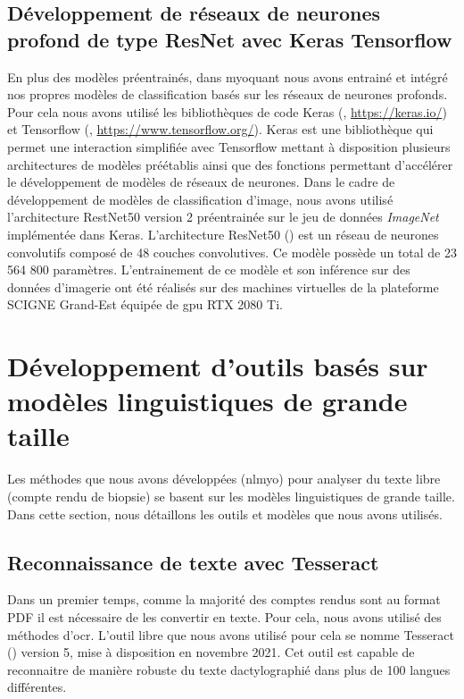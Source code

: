 \subsection{Développement de réseaux de neurones profond de type ResNet avec Keras Tensorflow}
En plus des modèles préentrainés, dans \gls{myoquant} nous avons entrainé et intégré nos propres modèles de classification basés sur les réseaux de neurones profonds. Pour cela nous avons utilisé les bibliothèques de code Keras (\cite{chollet_keras_2015}, \href{https://keras.io/}{https://keras.io/}) et Tensorflow (\cite{martin_abadi_tensorflow_2015}, \href{https://www.tensorflow.org/}{https://www.tensorflow.org/}). Keras est une bibliothèque qui permet une interaction simplifiée avec Tensorflow mettant à disposition plusieurs architectures de modèles préétablis ainsi que des fonctions permettant d'accélérer le développement de modèles de réseaux de neurones. Dans le cadre de développement de modèles de classification d'image, nous avons utilisé l'architecture RestNet50 version 2 préentrainée sur le jeu de données \textit{ImageNet} implémentée dans Keras. L'architecture ResNet50 (\cite{he_deep_2015}) est un réseau de neurones convolutifs composé de 48 couches convolutives. Ce modèle possède un total de 23 564 800 paramètres. L'entrainement de ce modèle et son inférence sur des données d'imagerie ont été réalisés sur des machines virtuelles de la plateforme SCIGNE Grand-Est équipée de \gls{gpu} RTX 2080 Ti.

\section{Développement d'outils basés sur modèles linguistiques de grande taille}
Les méthodes que nous avons développées (\gls{nlmyo}) pour analyser du texte libre (compte rendu de biopsie) se basent sur les modèles linguistiques de grande taille. Dans cette section, nous détaillons les outils et modèles que nous avons utilisés.

\subsection{Reconnaissance de texte avec Tesseract}
Dans un premier temps, comme la majorité des comptes rendus sont au format PDF il est nécessaire de les convertir en texte. Pour cela, nous avons utilisé des méthodes d'\gls{ocr}. L'outil libre que nous avons utilisé pour cela se nomme Tesseract (\cite{ray_tesseract_2015}) version 5, mise à disposition en novembre 2021. Cet outil est capable de reconnaitre de manière robuste du texte dactylographié dans plus de 100 langues différentes.

